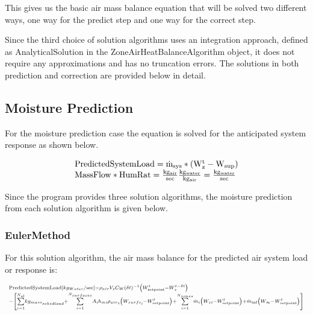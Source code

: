 This gives us the basic air mass balance equation that will be solved two different ways, one way for the predict step and one way for the correct step.

Since the third choice of solution algorithms uses an integration approach, defined as AnalyticalSolution in the ZoneAirHeatBalanceAlgorithm object, it does not require any approximations and has no truncation errors. The solutions in both prediction and correction are provided below in detail.

\subsection{Moisture Prediction}\label{moisture-prediction}

For the moisture prediction case the equation is solved for the anticipated system response as shown below.

\begin{equation}
\begin{array}{l}
    \rm{PredictedSystemLoad} = \dot{m}_{sys}*\left(W_z^t - W_{sup}\right) \\
    \rm{MassFlow * HumRat} = \frac{kg_{air}}{sec}\frac{kg_{water}}{kg_{air}} = \frac{kg_{water}}{sec}
  \end{array}
\end{equation}

Since the program provides three solution algorithms, the moisture prediction from each solution algorithm is given below.

\subsubsection{EulerMethod}\label{eulermethod-001}

For this solution algorithm, the air mass balance for the predicted air system load or response is:

\begin{equation}
\medmuskip=0mu
\thinmuskip=0mu
\thickmuskip=0mu
\nulldelimiterspace=0pt
\scriptspace=0pt
\scriptsize{\begin{array}{l}{\rm{PredictedSystemLoad}}\;[k{g_{Water}}/\sec ] = {\rho_{air}}{V_z}{C_W}{\left( {\delta t} \right)^{ - 1}}\left( {W_{{\rm{setpoint}}}^t - W_z^{t - \delta t}} \right) \\
- \left[ {\sum\limits_{i = 1}^{{N_{sl}}} {k{g_{mas{s_{sched\;load}}}}}  + \sum\limits_{i = 1}^{{N_{surfaces}}} {{A_i}{h_{mi}}} {\rho_{ai{r_z}}}\left( {{W_{surf{s_i}}} - W_{{\rm{setpoint}}}^t} \right) + \sum\limits_{i = 1}^{{N_{zones}}} {{{\dot m}_i}} \left( {{W_{zi}} - W_{{\rm{setpoint}}}^t} \right) + {{\dot m}_{\inf }}\left( {{W_\infty } - W_{{\rm{setpoint}}}^t} \right)} \right]\\\;\;\;\;\;\;\;\;\;\;\;\;\;\;\;\;\;\;\;\;\;\;\;\;\;\;\;\;\;\;\;\;\;\;\;\end{array}}
\end{equation}

